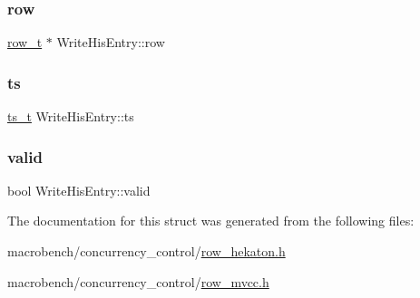 \mbox{\label{structWriteHisEntry_a0f87b3c9233028148a9eb39c03c3f0b2}} 
\subsubsection{\texorpdfstring{row}{row}}
{\footnotesize\ttfamily \hyperlink{classrow__t}{row\+\_\+t} $\ast$ Write\+His\+Entry\+::row}

\mbox{\label{structWriteHisEntry_a38db60cf5ebf583e144790fbbc230027}} 
\subsubsection{\texorpdfstring{ts}{ts}}
{\footnotesize\ttfamily \hyperlink{global_8h_aaf095dfc9b10f757c968fe146ad7e724}{ts\+\_\+t} Write\+His\+Entry\+::ts}

\mbox{\label{structWriteHisEntry_a86ba4fa82557ee6db6e06fb84e38f8f6}} 
\subsubsection{\texorpdfstring{valid}{valid}}
{\footnotesize\ttfamily bool Write\+His\+Entry\+::valid}



The documentation for this struct was generated from the following files\+:\begin{DoxyCompactItemize}
\item 
macrobench/concurrency\+\_\+control/\hyperlink{row__hekaton_8h}{row\+\_\+hekaton.\+h}\item 
macrobench/concurrency\+\_\+control/\hyperlink{row__mvcc_8h}{row\+\_\+mvcc.\+h}\end{DoxyCompactItemize}
